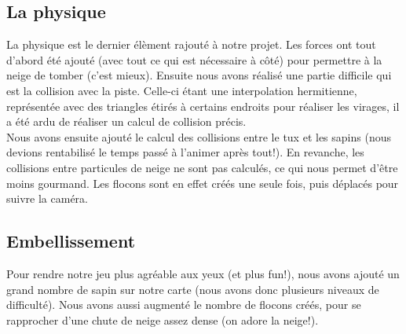 \documentclass[11pt]{article}
\begin{document}
    \subsection{La physique}

    La physique est le dernier élèment rajouté à notre projet.
    Les forces ont tout d'abord été ajouté (avec tout ce qui est nécessaire à côté) pour permettre à la neige de tomber (c'est mieux).
    Ensuite nous avons réalisé une partie difficile qui est la collision avec la piste.
    Celle-ci étant une interpolation hermitienne, représentée avec des triangles étirés à certains endroits pour réaliser les virages, il a été ardu de réaliser un calcul de collision précis.\\
    Nous avons ensuite ajouté le calcul des collisions entre le tux et les sapins (nous devions rentabilisé le temps passé à l'animer après tout!).
    En revanche, les collisions entre particules de neige ne sont pas calculés, ce qui nous permet d'être moins gourmand.
    Les flocons sont en effet créés une seule fois, puis déplacés pour suivre la caméra.

    \subsection{Embellissement}
    Pour rendre notre jeu plus agréable aux yeux (et plus fun!), nous avons ajouté un grand nombre de sapin sur notre carte (nous avons donc plusieurs niveaux de difficulté).
    Nous avons aussi augmenté le nombre de flocons créés, pour se rapprocher d'une chute de neige assez dense (on adore la neige!).
\end{document}
